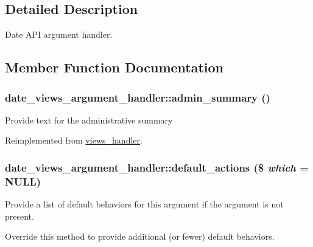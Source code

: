 \subsection{Detailed Description}
Date API argument handler. 

\subsection{Member Function Documentation}
\hypertarget{classdate__views__argument__handler_a628ee4d992b0417645e0aafeeb733b28}{
\subsubsection[{admin\_\-summary}]{\setlength{\rightskip}{0pt plus 5cm}date\_\-views\_\-argument\_\-handler::admin\_\-summary ()}}
\label{classdate__views__argument__handler_a628ee4d992b0417645e0aafeeb733b28}
Provide text for the administrative summary 

Reimplemented from \hyperlink{classviews__handler_a27a5cb35f3f17322957730a95b6be11e}{views\_\-handler}.\hypertarget{classdate__views__argument__handler_a04e1475ee2f7f3d532342a91cde08970}{
\subsubsection[{default\_\-actions}]{\setlength{\rightskip}{0pt plus 5cm}date\_\-views\_\-argument\_\-handler::default\_\-actions (\$ {\em which} = {\ttfamily NULL})}}
\label{classdate__views__argument__handler_a04e1475ee2f7f3d532342a91cde08970}
Provide a list of default behaviors for this argument if the argument is not present.

Override this method to provide additional (or fewer) default behaviors. 


